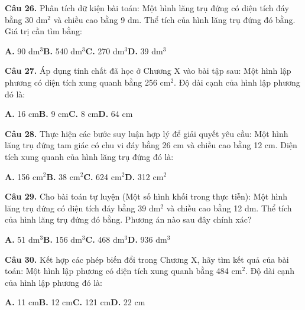 \documentclass[11pt,a4paper]{article}
\begin{document}
\textbf{\color{primary} Câu 26.} Phân tích dữ kiện bài toán: Một hình lăng trụ đứng có diện tích đáy bằng 30 dm$^2$ và chiều cao bằng 9 dm. Thể tích của hình lăng trụ đứng đó bằng. Giá trị cần tìm bằng:\par
\hspace*{1.5em}\textbf{A.} 90 dm$^3$\quad\quad \textbf{B.} 540 dm$^3$\quad\quad \textbf{C.} 270 dm$^3$\quad\quad \textbf{D.} 39 dm$^3$\par\vspace{2pt}
\textbf{\color{primary} Câu 27.} Áp dụng tính chất đã học ở Chương X vào bài tập sau: Một hình lập phương có diện tích xung quanh bằng 256 cm$^2$. Độ dài cạnh của hình lập phương đó là:\par
\hspace*{1.5em}\textbf{A.} 16 cm\quad\quad \textbf{B.} 9 cm\quad\quad \textbf{C.} 8 cm\quad\quad \textbf{D.} 64 cm\par\vspace{2pt}
\textbf{\color{primary} Câu 28.} Thực hiện các bước suy luận hợp lý để giải quyết yêu cầu: Một hình lăng trụ đứng tam giác có chu vi đáy bằng 26 cm và chiều cao bằng 12 cm. Diện tích xung quanh của hình lăng trụ đứng đó là:\par
\hspace*{1.5em}\textbf{A.} 156 cm$^2$\quad\quad \textbf{B.} 38 cm$^2$\quad\quad \textbf{C.} 624 cm$^2$\quad\quad \textbf{D.} 312 cm$^2$\par\vspace{2pt}
\textbf{\color{primary} Câu 29.} Cho bài toán tự luyện (Một số hình khối trong thực tiễn): Một hình lăng trụ đứng có diện tích đáy bằng 39 dm$^2$ và chiều cao bằng 12 dm. Thể tích của hình lăng trụ đứng đó bằng. Phương án nào sau đây chính xác?\par
\hspace*{1.5em}\textbf{A.} 51 dm$^3$\quad\quad \textbf{B.} 156 dm$^3$\quad\quad \textbf{C.} 468 dm$^3$\quad\quad \textbf{D.} 936 dm$^3$\par\vspace{2pt}
\textbf{\color{primary} Câu 30.} Kết hợp các phép biến đổi trong Chương X, hãy tìm kết quả của bài toán: Một hình lập phương có diện tích xung quanh bằng 484 cm$^2$. Độ dài cạnh của hình lập phương đó là:\par
\hspace*{1.5em}\textbf{A.} 11 cm\quad\quad \textbf{B.} 12 cm\quad\quad \textbf{C.} 121 cm\quad\quad \textbf{D.} 22 cm\par\vspace{2pt}
\end{document}
